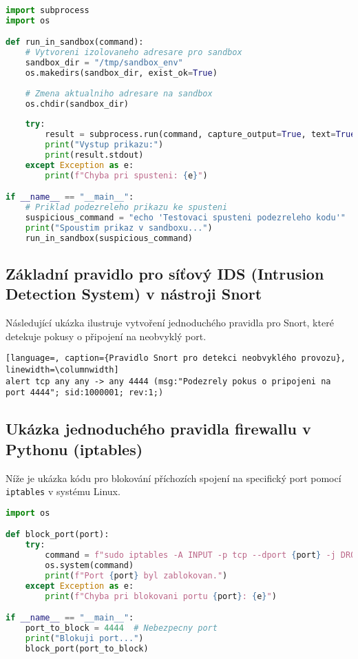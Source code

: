 \documentclass[11pt, conference, a4paper]{IEEEtran}
\begin{document}
\begin{lstlisting}[language=Python, caption={Spuštění kódu v sandboxu}, linewidth=\columnwidth]
import subprocess
import os

def run_in_sandbox(command):
    # Vytvoreni izolovaneho adresare pro sandbox
    sandbox_dir = "/tmp/sandbox_env"
    os.makedirs(sandbox_dir, exist_ok=True)
    
    # Zmena aktualniho adresare na sandbox
    os.chdir(sandbox_dir)
    
    try:
        result = subprocess.run(command, capture_output=True, text=True, shell=True)
        print("Vystup prikazu:")
        print(result.stdout)
    except Exception as e:
        print(f"Chyba pri spusteni: {e}")

if __name__ == "__main__":
    # Priklad podezreleho prikazu ke spusteni
    suspicious_command = "echo 'Testovaci spusteni podezreleho kodu'"
    print("Spoustim prikaz v sandboxu...")
    run_in_sandbox(suspicious_command)
\end{lstlisting}

\subsection{Základní pravidlo pro síťový IDS (Intrusion Detection System) v nástroji Snort}

Následující ukázka ilustruje vytvoření jednoduchého pravidla pro Snort, které detekuje pokusy o připojení na neobvyklý port.

\begin{lstlisting}[language=, caption={Pravidlo Snort pro detekci neobvyklého provozu}, linewidth=\columnwidth]
alert tcp any any -> any 4444 (msg:"Podezrely pokus o pripojeni na port 4444"; sid:1000001; rev:1;)
\end{lstlisting}

\subsection{Ukázka jednoduchého pravidla firewallu v Pythonu (iptables)}

Níže je ukázka kódu pro blokování příchozích spojení na specifický port pomocí \texttt{iptables} v systému Linux.

\begin{lstlisting}[language=Python, caption={Blokování portu pomocí iptables}, linewidth=\columnwidth]
import os

def block_port(port):
    try:
        command = f"sudo iptables -A INPUT -p tcp --dport {port} -j DROP"
        os.system(command)
        print(f"Port {port} byl zablokovan.")
    except Exception as e:
        print(f"Chyba pri blokovani portu {port}: {e}")

if __name__ == "__main__":
    port_to_block = 4444  # Nebezpecny port
    print("Blokuji port...")
    block_port(port_to_block)
\end{lstlisting}
\end{document}
